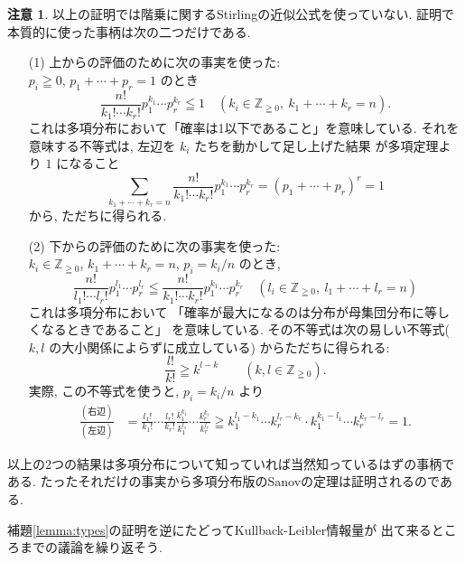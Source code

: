 \documentclass[12pt,twoside]{jarticle}
\newcommand\Z{{\mathbb Z}} %
\theoremstyle{definition} %
\theoremstyle{definition} %
\theoremstyle{definition} %
\newtheorem{remark}[theorem]{注意}
\numberwithin{theorem}{section}
\numberwithin{equation}{section}
\numberwithin{figure}{section}
\numberwithin{table}{section}
\newcommand\lemmaref[1]{補題\ref{#1}}
\begin{document}
\begin{remark}
以上の証明では階乗に関するStirlingの近似公式を使っていない.
証明で本質的に使った事柄は次の二つだけである.
\begin{enumerate}
\item[(1)] 上からの評価のために次の事実を使った: \\
$p_i\geqq 0$, $p_1+\cdots+p_r=1$ のとき
\[
\frac{n!}{k_1!\cdots k_r!}p_1^{k_1}\cdots p_r^{k_r}\leqq 1
\quad
(k_i\in\Z_{\geqq 0},\ k_1+\cdots+k_r=n).
\]
これは多項分布において「確率は1以下であること」を意味している.
それを意味する不等式は, 左辺を $k_i$ たちを動かして足し上げた結果
が多項定理より $1$ になること
\[
\sum_{k_1+\cdots+k_r=n}
\frac{n!}{k_1!\cdots k_r!}p_1^{k_1}\cdots p_r^{k_r}
= (p_1+\cdots+p_r)^r
= 1
\]
から, ただちに得られる.

\item[(2)] 下からの評価のために次の事実を使った: \\
$k_i\in\Z_{\geqq 0}$, $k_1+\cdots+k_r=n$, $p_i=k_i/n$ のとき,
\[
\frac{n!}{l_1!\cdots l_r!}p_1^{l_1}\cdots p_r^{l_r}
\leqq
\frac{n!}{k_1!\cdots k_r!}p_1^{k_1}\cdots p_r^{k_r}
\quad
(l_i\in\Z_{\geqq 0},\ l_1+\cdots+l_r=n)
\]
これは多項分布において
「確率が最大になるのは分布が母集団分布に等しくなるときであること」
を意味している.
その不等式は次の易しい不等式($k,l$ の大小関係によらずに成立している)
からただちに得られる:
\[
\frac{l!}{k!}\geqq k^{l-k}
\qquad (k,l\in\Z_{\geqq 0}).
\]
実際, この不等式を使うと, $p_i=k_i/n$ より
\begin{align*}
\frac{(\text{右辺})}{(\text{左辺})}
&
=
\frac{l_1!}{k_1!}\cdots\frac{l_r!}{k_r!}
\frac{k_1^{k_1}}{k_1^{l_1}}\cdots\frac{k_r^{k_r}}{k_r^{l_r}}
\geqq k_1^{l_1-k_1}\cdots k_r^{l_r-k_r}\cdot k_1^{k_1-l_1}\cdots k_r^{k_r-l_r}
=1.
\end{align*}
\end{enumerate}
以上の2つの結果は多項分布について知っていれば当然知っているはずの事柄である.
たったそれだけの事実から多項分布版のSanovの定理は証明されるのである.

\lemmaref{lemma:types}の証明を逆にたどってKullback-Leibler情報量が
出て来るところまでの議論を繰り返そう.


\end{remark}
\end{document}
